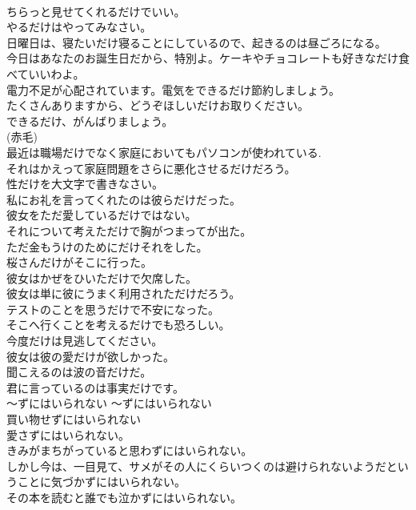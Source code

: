 \documentclass[8pt]{extreport}
\begin{document}
\begin{CJK}{UTF8}{min}
\\	ちらっと見せてくれるだけでいい。  
\\	やるだけはやってみなさい。  
\\	日曜日は、寝たいだけ寝ることにしているので、起きるのは昼ごろになる。  
\\	今日はあなたのお誕生日だから、特別よ。ケーキやチョコレートも好きなだけ食べていいわよ。  
\\	電力不足が心配されています。電気をできるだけ節約しましょう。  
\\	たくさんありますから、どうぞほしいだけお取りください。  
\\	できるだけ、がんばりましょう。  
\\	(赤毛)
\\	最近は職場だけでなく家庭においてもパソコンが使われている.  
\\	それはかえって家庭問題をさらに悪化させるだけだろう。  
\\	性だけを大文字で書きなさい。  
\\	私にお礼を言ってくれたのは彼らだけだった。  
\\	彼女をただ愛しているだけではない。  
\\	それについて考えただけで胸がつまってが出た。  
\\	ただ金もうけのためにだけそれをした。  
\\	桜さんだけがそこに行った。  
\\	彼女はかぜをひいただけで欠席した。  
\\	彼女は単に彼にうまく利用されただけだろう。  
\\	テストのことを思うだけで不安になった。  
\\	そこへ行くことを考えるだけでも恐ろしい。  
\\	今度だけは見逃してください。  
\\	彼女は彼の愛だけが欲しかった。  
\\	聞こえるのは波の音だけだ。  
\\	君に言っているのは事実だけです。  
\\	〜ずにはいられない	〜ずにはいられない	
\\	買い物せずにはいられない  
\\	愛さずにはいられない。  
\\	きみがまちがっていると思わずにはいられない。   
\\	しかし今は、一目見て、サメがその人にくらいつくのは避けられないようだということに気づかずにはいられない。   
\\	その本を読むと誰でも泣かずにはいられない。   

\end{CJK}
\end{document}
